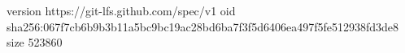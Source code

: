 version https://git-lfs.github.com/spec/v1
oid sha256:067f7cb6b9b3b11a5bc9bc19ac28bd6ba7f3f5d6406ea497f5fe512938fd3de8
size 523860

